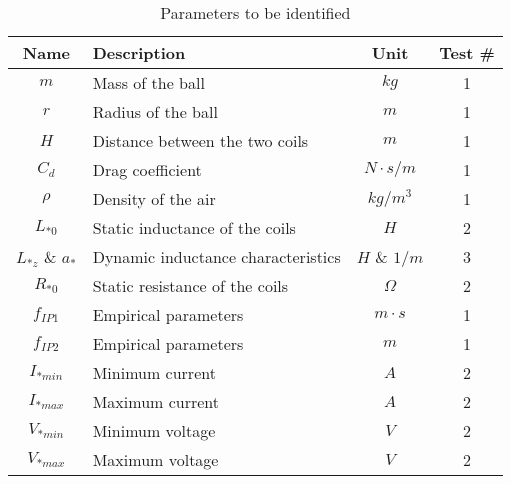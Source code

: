 \begin{table}[H]

    \centering
    \begin{tabular}{|c|l|c|c|}
        \hline
        \textbf{Name}     & \textbf{Description}               & \textbf{Unit} & \textbf{Test \#} \\
        \hline
        $m$               & Mass of the ball                   & $kg$          & 1                \\
        $r$               & Radius of the ball                 & $m$           & 1                \\
        $H$               & Distance between the two coils     & $m$           & 1                \\
        $C_d$             & Drag coefficient                   & $N \cdot s/m$ & 1                \\
        $\rho$            & Density of the air                 & $kg/m^3$      & 1                \\
        $L_{*0}$          & Static inductance of the coils     & $H$           & 2                \\
        $L_{*z}$ \& $a_*$ & Dynamic inductance characteristics & $H$ \& $1/m$  & 3                \\
        $R_{*0}$          & Static resistance of the coils     & $\Omega$      & 2                \\
        $f_{IP1}$         & Empirical parameters               & $m\cdot s$    & 1                \\
        $f_{IP2}$         & Empirical parameters               & $m$           & 1                \\
        $I_{*min}$        & Minimum current                    & $A$           & 2                \\
        $I_{*max}$        & Maximum current                    & $A$           & 2                \\
        $V_{*min}$        & Minimum voltage                    & $V$           & 2                \\
        $V_{*max}$        & Maximum voltage                    & $V$           & 2                \\
        \hline
    \end{tabular}

    \caption{Parameters to be identified}
    \label{tab:parameters_to_be_identified}

\end{table}

